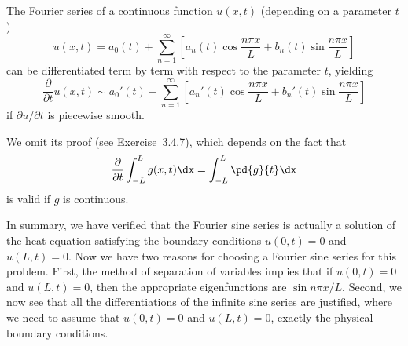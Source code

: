 The Fourier series of a continuous function $u(x,t)$ (depending on a parameter $t$)
\begin{equation}
\label{eq:fourier-t-dep}
u(x,t) = a_0(t) + \sum_{n=1}^{\infty}\left[a_n(t)\cos\frac{n\pi x}{L} + b_n(t)\sin\frac{n\pi x}{L}\right]
\end{equation}
can be differentiated term by term with respect to the parameter $t$, yielding
\[
\frac{\partial}{\partial t}u(x,t) \sim a_0'(t) + \sum_{n=1}^{\infty}\left[a_n'(t)\cos\frac{n\pi x}{L} + b_n'(t)\sin\frac{n\pi x}{L}\right]
\]
if $\partial u/\partial t$ is piecewise smooth.

We omit its proof (see Exercise~3.4.7), which depends on the fact that
\[
\frac{\partial}{\partial t} \int_{-L}^{L} g(x,t) \dx = \int_{-L}^{L} \pd{g}{t} \dx
\]
is valid if $g$ is continuous.

In summary, we have verified that the Fourier sine series is actually a solution of the heat equation satisfying the boundary conditions $u(0,t) = 0$ and $u(L,t) = 0$.  Now we have two reasons for choosing a Fourier sine series for this problem.  First, the method of separation of variables implies that if $u(0,t) = 0$ and $u(L,t) = 0$, then the appropriate eigenfunctions are $\sin n\pi x/L$.  Second, we now see that all the differentiations of the infinite sine series are justified, where we need to assume that $u(0,t) = 0$ and $u(L,t) = 0$, exactly the physical boundary conditions.

